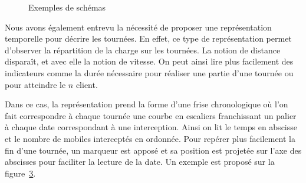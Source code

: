 			\begin{figure}[h!]
				\begin{subfigure}[b]{.45\linewidth}
					\centering
					\begin{tikzpicture}[scale=.5]
						
					\end{tikzpicture}
					\label{subfig:spatial}
				\end{subfigure}
				\hfill
				\begin{subfigure}[b]{.45\linewidth}
					\centering
					\vfill
					\begin{tikzpicture}[schema]
						
					\end{tikzpicture}
					\vfill
					\null
					\label{subfig:schema}
				\end{subfigure}

				\begin{subfigure}{\linewidth}
					\centering
					\begin{tikzpicture}[yscale=.5]
						
					\end{tikzpicture}
					\label{subfig:example-temporal}
				\end{subfigure}
				\caption{Exemples de schémas}
				\label{fig:example}
			\end{figure}

			Nous avons également entrevu la nécessité de proposer une représentation temporelle pour décrire les tournées. En effet, ce type de représentation permet d'observer la répartition de la charge sur les tournées. La notion de distance disparaît, et avec elle la notion de vitesse. On peut ainsi lire plus facilement des indicateurs comme la durée nécessaire pour réaliser une partie d'une tournée ou pour atteindre le $n$\ieme{} client.

			Dans ce cas, la représentation prend la forme d'une frise chronologique où l'on fait correspondre à chaque tournée une courbe en escaliers franchissant un palier à chaque date correspondant à une interception. Ainsi on lit le temps en abscisse et le nombre de mobiles interceptés en ordonnée. Pour repérer plus facilement la fin d'une tournée, un marqueur est apposé et sa position est projetée sur l'axe des abscisses pour faciliter la lecture de la date. Un exemple est proposé sur la figure~\ref{subfig:example-temporal}.

		

